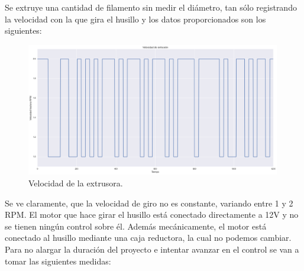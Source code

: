 Se extruye una cantidad de filamento sin medir el diámetro, tan sólo registrando la velocidad con la que gira el husillo y los datos proporcionados son los siguientes:

\begin{figure}[H]
    \centering
    \includegraphics[width=0.99\textwidth]{images/producciones/20072015/RPM_tract.png}
    \caption{Velocidad de la extrusora.}
    \label{fig:2007105-grafenc}
\end{figure}

Se ve claramente, que la velocidad de giro no es constante, variando entre 1 y 2 RPM. El motor que hace girar el husillo está conectado directamente a 12V y no se tienen ningún control sobre él. Además mecánicamente, el motor está conectado al husillo mediante una caja reductora, la cual no podemos cambiar. Para no alargar la duración del proyecto e intentar avanzar en el control se van a tomar las siguientes medidas:

